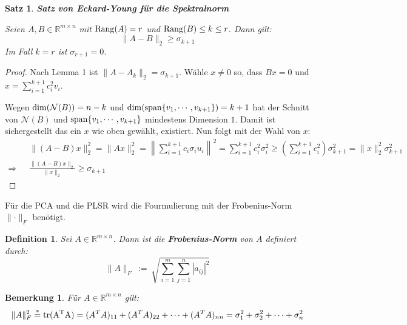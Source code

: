 \documentclass{article}
\newcommand{\R}[0]{\mathbb{R}}
\newtheorem{defin}{Definition}
\newtheorem{bem}{Bemerkung}
\newtheorem{thm}{Satz}
\begin{document}
\begin{thm} \textbf{Satz von Eckard-Young für die Spektralnorm}

    Seien $A, B \in \R^{m \times n}$ mit ${\rm Rang}(A) = r$ und ${\rm Rang}(B) \leq k \leq r$. Dann gilt:
    \begin{equation}
        \lVert A - B \rVert_2 \geq \sigma_{k+1}
    \end{equation}
    Im Fall $k = r$ ist $\sigma_{r+1} = 0$.
\end{thm}

\begin{proof}
    Nach Lemma 1 ist $\lVert A - A_k \rVert_2 = \sigma_{k+1}$. Wähle $x \neq 0$ so, dass $Bx = 0$ und $x = \sum\limits_{i=1}^{k+1} c_i^2v_i$.

    Wegen ${\rm dim}(\mathcal{N}(B)) = n - k$ und ${\rm dim}({\rm span}\{v_1, \cdots, v_{k+1}\}) = k + 1$ hat der Schnitt von $\mathcal{N}(B)$ und ${\rm span}\{v_1, \cdots, v_{k+1}\}$ mindestens Dimension $1$. 
    Damit ist sichergestellt das ein $x$ wie oben gewählt, existiert. Nun folgt mit der Wahl von $x$:
    \begin{align*}
        &\lVert(A-B)x\rVert_2^2 = \lVert Ax \rVert^2_2 = \left\lVert \sum\limits_{i=1}^{k+1} c_i\sigma_i u_i \right\rVert^2 = \sum\limits_{i=1}^{k+1}c_i^2\sigma_i^2 \geq \left(\sum\limits_{i=1}^{k+1}c_i^2\right)\sigma_{k+1}^2 = \lVert x \rVert_2^2 \sigma_{k+1}^2 \\
    \Rightarrow \:\:\: &\frac{\lVert (A - B)x \rVert_2}{\lVert x \rVert_2} \geq \sigma_{k+1}
    \end{align*}
\end{proof}

Für die PCA und die PLSR wird die Fourmulierung mit der Frobenius-Norm $\lVert \cdot \rVert_F$ benötigt.

\begin{defin}
    Sei $A \in \R^{m \times n}$. Dann ist die \textbf{Frobenius-Norm} von $A$ definiert durch:
    \begin{equation}
        \lVert A \rVert_F \: := \: \sqrt{\sum_{i=1}^{m}\sum_{j=1}^{n} |a_{ij}|^2}
    \end{equation}
\end{defin}

\begin{bem}
    Für $A \in \R^{m \times n}$ gilt:
    \begin{equation}
        \lVert A \rVert_F^2 \overset{*}{=} {\rm tr(A^TA)} = (A^TA)_{11} + (A^TA)_{22} + \cdots + (A^TA)_{nn} = \sigma_1^2 + \sigma_2^2 + \cdots + \sigma_n^2        
    \end{equation}
\end{bem}
\end{document}
